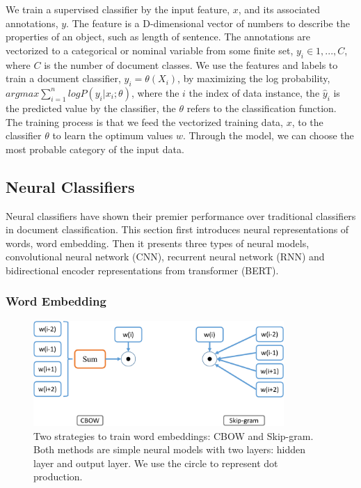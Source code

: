 We train a supervised classifier by the input feature, $x$, and its associated annotations, $y$. The feature is a D-dimensional vector of numbers to describe the properties of an object, such as length of sentence. The annotations are vectorized to a categorical or nominal variable from some finite set, $y_i \in {1, ..., C}$, where $C$ is the number of document classes. We use the features and labels to train a document classifier, $\hat{y}_i = \theta(X_i)$, by maximizing the log probability, $argmax\sum_{i=1}^nlog P(y_i | x_i; \theta)$, where the $i$ the index of data instance, the $\hat{y}_i$ is the predicted value by the classifier, the $\theta$ refers to the classification function. The training process is that we feed the vectorized training data, $x$, to the classifier $\theta$ to learn the optimum values $w$. Through the model, we can choose the most probable category of the input data.


\subsection{Neural Classifiers}

Neural classifiers have shown their premier performance over traditional classifiers in document classification.
This section first introduces neural representations of words, word embedding.
Then it presents three types of neural models, convolutional neural network (CNN), recurrent neural network (RNN) and bidirectional encoder representations from transformer (BERT).

\subsubsection{Word Embedding}
\label{chap2:subsubsec:emb}

\begin{figure}[t!]
\centering
\includegraphics[width=0.85\textwidth]{images/chapter2/word2vec.pdf}
\caption{Two strategies to train word embeddings: CBOW and Skip-gram. Both methods are simple neural models with two layers: hidden layer and output layer. We use the circle to represent dot production.}
\label{chap2:fig:embd}
\end{figure}

